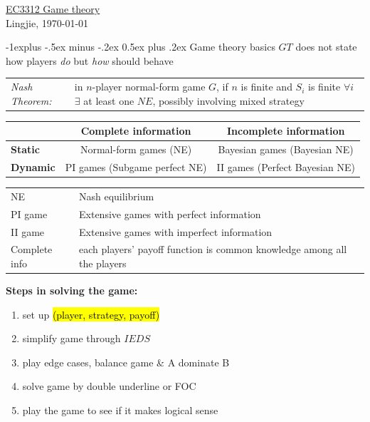 \documentclass[10pt,landscape]{article}
\makeatletter
\renewcommand{\subsection}{\@startsection{subsection}{2}{0mm}%
                                {-1explus -.5ex minus -.2ex}%
                                {0.5ex plus .2ex}%
                                {\normalfont\normalsize\bfseries\color{blue}}}
\makeatother
\begin{document}
\raggedright
\footnotesize
\begin{multicols}{3}


\setlength{\premulticols}{1pt}
\setlength{\postmulticols}{1pt}
\setlength{\multicolsep}{1pt}
\setlength{\columnsep}{2pt}

\begin{center}
     \Large{\underline{EC3312 Game theory}} \\
     Lingjie, \today
\end{center}

\subsection{Game theory basics}
	$GT$ does not state how players \textit{do} but \textit{how} should behave\\
	\begin{tabulary}{\linewidth}{lL}
	\emph{Nash Theorem:} & in $n$-player normal-form game $G$, if $n$ is finite and $S_i$ is finite $\forall i$ $\exists$ at least one $NE$, possibly involving mixed strategy\\
	\end{tabulary}
	
	\begin{tabulary}{\linewidth}{|l|C|C|}
		\hline
				&	\textbf{Complete information}			&		\textbf{Incomplete information}\\
		\hline
		\textbf{Static}	&	Normal-form games	(NE)			&		Bayesian games (Bayesian NE)\\
		\hline
		\textbf{Dynamic}	&	PI games (Subgame perfect NE)	&		II games (Perfect Bayesian NE)\\
		\hline
	\end{tabulary}
	\begin{tabulary}{\linewidth}{l@{ = }L}
		NE & Nash equilibrium \\
		PI game & Extensive games with perfect information \\
		II game & Extensive games with imperfect information \\
		Complete info & each players' payoff function is common knowledge among all the players
	\end{tabulary}
	
	\textbf{Steps in solving the game:}\\
	\begin{enumerate}
		\item set up \hl{(player, strategy, payoff)}
		\item simplify game through $IEDS$
		\item play edge cases, balance game \& A dominate B
		\item solve game by double underline or FOC
		\item play the game to see if it makes logical sense
	\end{enumerate}


\end{multicols}
\end{document}
